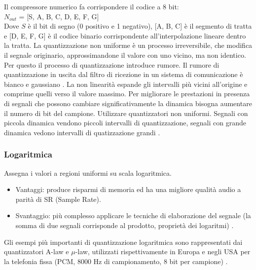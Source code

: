 \documentclass[a4paper]{report} %
\begin{document}
Il compressore numerico fa corrispondere il codice a 8 bit: \\
$N_{out}$ = [S, A, B, C, D, E, F, G] \\
Dove $S$ è il bit di segno (0 positivo e 1 negativo), [A, B, C] è il segmento di tratta e [D, E, F, G] è il codice binario corrispondente all'interpolazione lineare dentro la tratta.
La quantizzazione non uniforme è un processo irreversibile, che modifica il segnale originario, approssimandone il valore con uno vicino, ma non identico. Per questo il processo di quantizzazione introduce rumore. Il rumore di quantizzazione in uscita dal filtro di ricezione in un sistema di comunicazione è bianco e gaussiano \cite{art:rif.6}. La non linearità espande gli intervalli più vicini all'origine e comprime quelli verso il valore massimo. Per migliorare le prestazioni in presenza di segnali che possono cambiare significativamente la dinamica bisogna aumentare il numero di bit del campione. Utilizzare quantizzatori non uniformi. Segnali con piccola dinamica vendono piccoli intervalli di quantizzazione, segnali con grande dinamica vedono intervalli di quatizzazione grandi \cite{art:rif.7, art:rif.8, art:rif.9}. 
\subsubsection{Logaritmica}
Assegna i valori a regioni uniformi su scala logaritmica.
\begin{itemize}
\item Vantaggi: produce risparmi di memoria ed ha una migliore qualità audio a parità di SR (Sample Rate).
\item Svantaggio: più complesso applicare le tecniche di elaborazione del segnale (la somma di due segnali corrisponde al prodotto, proprietà dei logaritmi) \cite{art:rif.16}.
\end{itemize}
Gli esempi più importanti di quantizzazione logaritmica sono rappresentati dai quantizzatori A-law e $\mu$-law, utilizzati rispettivamente in Europa e negli USA per la telefonia fissa (PCM, 8000 Hz di campionamento, 8 bit per campione) \cite{art:rif.5}. 
\end{document}
